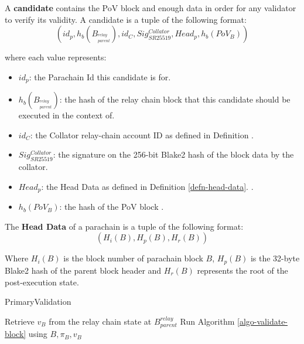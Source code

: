 \begin{definition}
  \label{defn-candidate}
  A \textbf{candidate} contains the PoV block and enough data in order for any
  validator to verify its validity. A candidate is a tuple of the following
  format:
  \[
  (id_p, h_b({B_{^{relay}_{parent}}}), id_{C}, Sig^{Collator}_{SR25519}, Head_p, h_b({PoV_B}))
  \]

  where each value represents:
  \begin{itemize}
    \item $id_p$: the Parachain Id this candidate is for.
    \item $h_b({B_{^{relay}_{parent}}})$: the hash of the relay chain block that this
    candidate should be executed in the context of.
    \item $id_C$: the Collator relay-chain account ID as defined in Definition
    .
    \item $Sig^{Collator}_{SR25519}$: the signature on the 256-bit Blake2 hash
    of the block data by the collator.
    \item $Head_p$: the Head Data as defined in Definition \ref{defn-head-data}.
    .
    \item $h_b({PoV_B})$: the hash of the PoV block
    .
  \end{itemize}

\end{definition}

\begin{definition}
  \label{defn-head-data}
  The \textbf{Head Data} of a parachain is a tuple of the following format:
  \[
    (H_i(B), H_p(B), H_r(B))
  \]

  Where $H_i(B)$ is the block number of parachain block $B$, $H_p(B)$ is the
  32-byte Blake2 hash of the parent block header and $H_r(B)$ represents the
  root of the post-execution state.
\end{definition}

\begin{algorithm}
  \caption[]{\sc PrimaryValidation}
  \label{algo-primary-validation}
  \begin{algorithmic}[1]

    \State Retrieve $v_B$ from the relay chain state at $B^{relay}_{parent}$
    \State Run Algorithm \ref{algo-validate-block} using $B, \pi_B, v_B$
  \end{algorithmic}
\end{algorithm}

